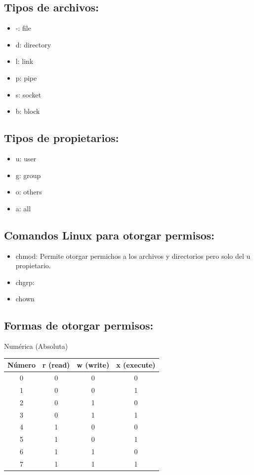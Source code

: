 \documentclass[11pt,twoside]{book}
\begin{document}
\subsection*{Tipos de archivos:}
\begin{itemize}
  \item -: file
  \item d: directory
  \item l: link
  \item p: pipe
  \item s: socket
  \item b: block
\end{itemize}
\subsection*{Tipos de propietarios:}
\begin{itemize}
  \item u: user
  \item g: group
  \item o: others 
  \item a: all
\end{itemize}

\subsection*{Comandos Linux para otorgar permisos:}
\begin{itemize}
  \item chmod: Permite otorgar permichos a los archivos y directorios pero solo del u propietario.
  \item chgrp: 
  \item chown
\end{itemize}

\subsection*{Formas de otorgar permisos:}

    \item Numérica (Absoluta)
        \begin{center}
        \begin{tabular}{|c|c|c|c|}
        \hline
        \textbf{Número} & \textbf{r (read)} & \textbf{w (write)} & \textbf{x (execute)} \\
        \hline
        0 & 0 & 0 & 0 \\
        1 & 0 & 0 & 1 \\
        2 & 0 & 1 & 0 \\
        3 & 0 & 1 & 1 \\
        4 & 1 & 0 & 0 \\
        5 & 1 & 0 & 1 \\
        6 & 1 & 1 & 0 \\
        7 & 1 & 1 & 1 \\
        \hline
        \end{tabular}
        \end{center}
        
\end{document}
